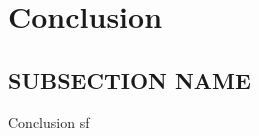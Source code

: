 \documentclass{beamer}
\begin{document}
\section{Conclusion}

\subsection{SUBSECTION NAME}
\begin{frame}{Conclusion}
sf
\end{frame}
\end{document}
